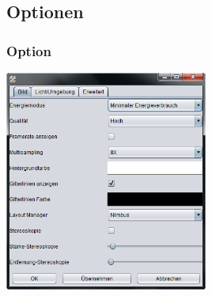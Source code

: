 \documentclass{beamer}
\begin{document}
\subsection{Optionen} 
\begin{frame}\frametitle{Option}
\includegraphics[width=0.5\textwidth]{images/program/settings0-window.png} 
\end{frame}

\end{document}
